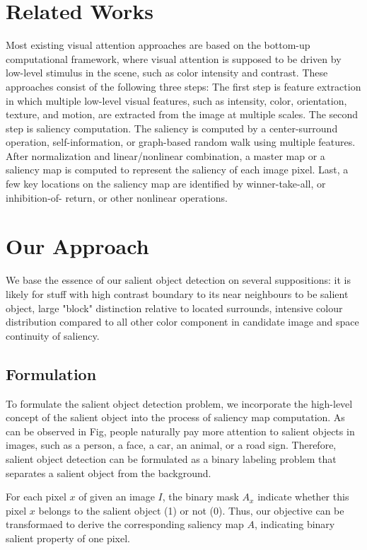 \documentclass[10pt,twocolumn,letterpaper]{article}
\begin{document}
\section{Related Works}
Most existing visual attention approaches are based on the bottom-up computational framework,
where visual attention is supposed to be driven by low-level stimulus in the scene,
such as color intensity and contrast. These approaches consist of the following three steps:
The first step is feature extraction in which multiple low-level visual features, such as
intensity, color, orientation, texture, and motion, are extracted from the image at multiple
scales. The second step is saliency computation. The saliency is computed by a center-surround
operation, self-information, or graph-based random walk using multiple features. After
normalization and linear/nonlinear combination, a master map or a saliency map is computed
to represent the saliency of each image pixel. Last, a few key locations on the saliency map
are identified by winner-take-all, or inhibition-of- return, or other nonlinear operations.

\section{Our Approach}

We base the essence of our salient object detection on several suppositions: 
it is likely for stuff with high contrast boundary to its near neighbours to be salient object, 
large "block" distinction relative to located surrounds, 
intensive colour distribution compared to all other color component
in candidate image and space continuity of saliency. \\

\subsection{Formulation}
    To formulate the salient object detection problem, we incorporate the high-level concept
    of the salient object into the process of saliency map computation.
    As can be observed in Fig, people naturally pay more attention to salient objects in images, such as a person,
    a face, a car, an animal, or a road sign. Therefore, salient object detection can be formulated as a binary
    labeling problem that separates a salient object from the background. 

    For each pixel $x$ of given an image $I$, the binary mask $A_x$ indicate whether this pixel
    $x$ belongs to the salient object (1) or not (0). Thus, our objective can be transformaed to 
    derive the corresponding saliency map $A$, indicating binary salient property of one pixel.
\end{document}

